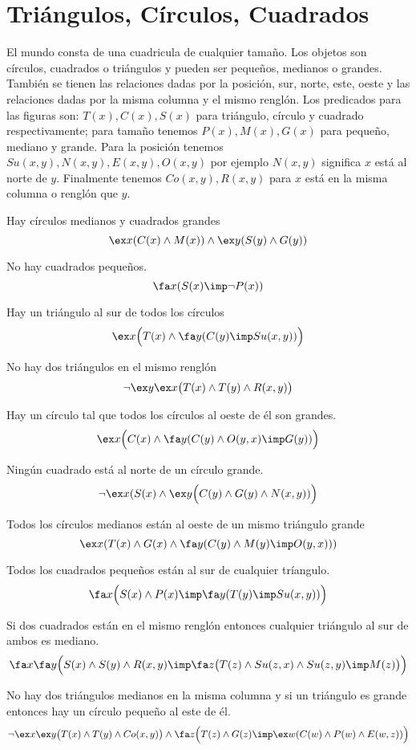\documentclass[11pt,letterpaper]{article}
\begin{document}
\section{Tri\'angulos, Círculos, Cuadrados}

El mundo consta de una cuadricula de cualquier tamaño. Los objetos son
c\'irculos, cuadrados o tri\'angulos y pueden ser pequeños, medianos o grandes.
También se tienen las relaciones dadas por la posición, sur, norte, este,
oeste y las relaciones dadas por la misma columna y el mismo renglón. Los
predicados para las figuras son: $T(x), C(x), S(x)$ para tri\'angulo, círculo y
cuadrado respectivamente; para tamaño tenemos $P(x),M(x),G(x)$ para pequeño,
mediano y grande. Para la posición tenemos $Su(x,y), N(x,y), E(x,y), O(x,y)$
por ejemplo $N(x,y)$ significa $x$ está al norte de $y$.
Finalmente tenemos $Co(x,y), R(x,y)$ para $x$ está en la misma columna o
renglón que $y$. 
\bi
 \item Hay c\'irculos medianos y cuadrados grandes
  \[
  \ex x(C(x)\land M(x))\land \ex y(S(y)\land G(y))
  \]
 \item No hay cuadrados pequeños.
  \[
  \fa x(S(x)\imp\neg P(x))
  \]
 \item Hay un tri\'angulo al sur de todos los c\'irculos
  \[
  \ex x\Big(T(x)\land \fa y(C(y)\imp Su(x,y))\Big)
  \]
 \item No hay dos tri\'angulos en el mismo renglón
  \[
  \neg\ex y\ex x\big(T(x)\land T(y)\land R(x,y)\big)
  \]
 \item Hay un círculo tal que todos los círculos al oeste de él son grandes.
  \[
  \ex x\Big(C(x)\land \fa y(C(y)\land O(y,x)\imp G(y))\Big)
  \]
 \item Ningún cuadrado está al norte de un círculo grande.
  \[
  \neg\ex x(S(x)\land \ex y\Big(C(y)\land G(y)\land N(x,y))\Big)
  \]
 \item Todos los c\'irculos medianos están al oeste de un mismo tri\'angulo 
grande
  \[
  \ex x(T(x)\land G(x)\land \fa y(C(y)\land M(y)\imp O(y,x)))
  \]
 \item Todos los cuadrados pequeños están al sur de cualquier tríangulo.
  \[
  \fa x\Big(S(x)\land P(x)\imp \fa y(T(y)\imp Su(x,y))\Big)
  \]
 \item Si dos cuadrados están en el mismo renglón entonces cualquier tri\'angulo
  al sur de ambos es mediano.
  \[
  \fa x\fa y\Big(S(x)\land S(y)\land R(x,y)\imp \fa z\big(T(z)\land 
  Su(z,x)\land Su(z,y)\imp M(z)\big)\Big)
  \]
 \item No hay dos tri\'angulos medianos en la misma columna y si un
  tri\'angulo es grande entonces hay un c\'irculo pequeño al este de él.
  \[
  \neg \ex x\ex y\big(T(x)\land T(y)\land Co(x,y)\big)\land
  \fa z\Big(T(z)\land G(z)\imp \ex w(C(w)\land P(w)\land E(w,z))\Big)
  \]
\ei
\end{document}
